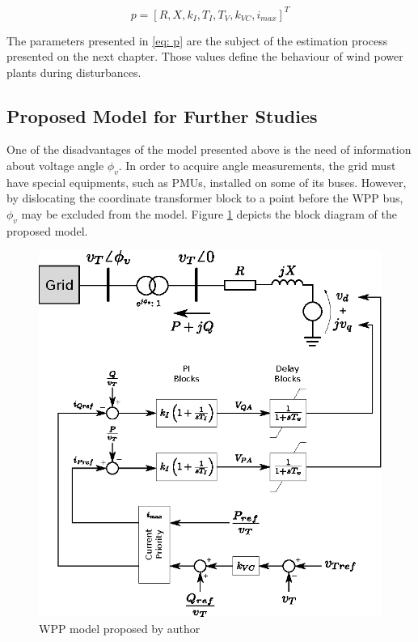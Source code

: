 \begin{equation}
	p = [R, X, k_{I}, T_{I}, T_{V}, k_{VC}, i_{max}]^T
	\label{eq: p}
\end{equation}

The parameters presented in \eqref{eq: p} are the subject of the estimation process presented on the next chapter. Those values define the behaviour of wind power plants during disturbances.

\subsection{Proposed Model for Further Studies}

One of the disadvantages of the model presented above is the need of information about voltage angle $\phi_{v}$. In order to acquire angle measurements, the grid must have special equipments, such as PMUs, installed on some of its buses. However, by dislocating the coordinate transformer block to a point before the WPP bus, $\phi_{v}$ may be excluded from the model. Figure \ref{fig: Proposed_Model} depicts the block diagram of the proposed model.

\begin{figure}[h]
	\caption{WPP model proposed by author}
	\begin{center}
		\includegraphics[scale=1]{Images/proposed_model.eps}
	\end{center}
	\label{fig: Proposed_Model}
\end{figure}

